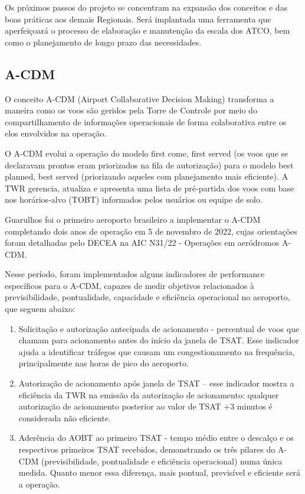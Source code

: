 \documentclass[
]{book}
\begin{document}
Os próximos passos do projeto se concentram na expansão dos conceitos e das boas práticas aos demais Regionais. Será implantada uma ferramenta que aperfeiçoará o processo de elaboração e manutenção da escala dos ATCO, bem como o planejamento de longo prazo das necessidades.

\hypertarget{a-cdm}{%
\subsection{A-CDM}\label{a-cdm}}

O conceito A-CDM (Airport Collaborative Decision Making) transforma a maneira como os voos são geridos pela Torre de Controle por meio do compartilhamento de informações operacionais de forma colaborativa entre os elos envolvidos na operação.

O A-CDM evolui a operação do modelo first come, first served (os voos que se declaravam prontos eram priorizados na fila de autorização) para o modelo best planned, best served (priorizando aqueles com planejamento mais eficiente). A TWR gerencia, atualiza e apresenta uma lista de pré-partida dos voos com base nos horários-alvo (TOBT) informados pelos usuários ou equipe de solo.

Guarulhos foi o primeiro aeroporto brasileiro a implementar o A-CDM completando dois anos de operação em 5 de novembro de 2022, cujas orientações foram detalhadas pelo DECEA na AIC N31/22 - Operações em aeródromos A-CDM.

Nesse período, foram implementados alguns indicadores de performance específicos para o A-CDM, capazes de medir objetivos relacionados à previsibilidade, pontualidade, capacidade e eficiência operacional no aeroporto, que seguem abaixo:

\begin{enumerate}
\def\labelenumi{\alph{enumi})}
\item
  Solicitação e autorização antecipada de acionamento - percentual de voos que chamam para acionamento antes do início da janela de TSAT. Esse indicador ajuda a identificar tráfegos que causam um congestionamento na frequência, principalmente nas horas de pico do aeroporto.
\item
  Autorização de acionamento após janela de TSAT -- esse indicador mostra a eficiência da TWR na emissão da autorização de acionamento: qualquer autorização de acionamento posterior ao valor de TSAT +3 minutos é considerada não eficiente.
\item
  Aderência do AOBT ao primeiro TSAT - tempo médio entre o descalço e os respectivos primeiros TSAT recebidos, demonstrando os três pilares do A-CDM (previsibilidade, pontualidade e eficiência operacional) numa única medida. Quanto menor essa diferença, mais pontual, previsível e eficiente será a operação.
\end{enumerate}
\end{document}
